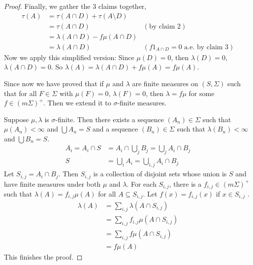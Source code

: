 \documentclass[a4paper, linespread=1.5]{article}
\begin{document}
\begin{proof}
        Finally, we gather the 3 claims together,
        \begin{align*}
            \tau(A)&=\tau(A\cap D)+\tau(A\setminus D) \\
                   &=\tau(A\cap D)&(\text{by claim 2})\\
                   &=\lambda(A\cap D)-f\mu(A\cap D)\\
                   &=\lambda(A\cap D) &(f 1_{A\cap D}=0 \text{ a.e. by claim 3})
        \end{align*}
        Now we apply this simplified version: Since $\mu(D)=0$, then $\lambda(D)=0$, $\lambda(A\cap D)=0$.
        So $\lambda(A)=\lambda(A\cap D)+f\mu(A)=f\mu(A)$.

        Since now we have proved that if $\mu$ and $\lambda$ are finite measures on $(S,\Sigma)$ such that for all $F\in\Sigma$ with $\mu(F)=0$, $\lambda(F)=0$, then $\lambda=f\mu$ for some $f\in(m\Sigma)^{+}$.
        Then we extend it to $\sigma$-finite measures.

        Suppose $\mu,\lambda$ is $\sigma$-finite.
        Then there exists a sequence $(A_n)\in\Sigma$ such that $\mu(A_n)<\infty$ and $\bigcup A_n=S$ and a sequence $(B_n)\in\Sigma$ such that $\lambda(B_n)<\infty$ and $\bigcup B_n=S$.
        \begin{align*}
            A_i=A_i \cap S &=A_i \cap \bigcup\limits_{j} B_j =\bigcup\limits_{j}A_i \cap B_j\\
            S&=\bigcup\limits_{i} A_i=\bigcup\limits_{i,j}A_i\cap B_j
        \end{align*}
        Let $S_{i,j}=A_i \cap B_j$.
        Then $S_{i,j}$ is a collection of disjoint sets whose union is $S$ and have finite measures under both $\mu$ and $\lambda$.
        For each $S_{i,j}$, there is a $f_{i,j}\in(m\Sigma)^{+}$ such that $\lambda(A)=f_{i,j}\mu(A)$ for all $A\subseteq S_{i,j}$.
        Let $f(x)=f_{i,j}(x)$ if $x\in S_{i,j}$ .
        \begin{align*}
            \lambda(A)&=\sum\limits_{i,j}\lambda(A\cap S_{i,j}) \\
                    &=\sum\limits_{i,j}f_{i,j}\mu(A\cap S_{i,j}) \\
                    &=\sum\limits_{i,j}f\mu(A\cap S_{i,j}) \\
                    &=f\mu(A)
        \end{align*}
        This finishes the proof.

    \end{proof}
\end{document}
